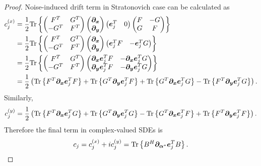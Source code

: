 \begin{proof}
Noise-induced drift term in Stratonovich case can be calculated as
\begin{equation*}
\begin{split}
	c_j^{(x)}
	& = \frac{1}{2} \mathrm{Tr} \left\{ 
		\begin{pmatrix}
			F^T & G^T \\ -G^T & F^T
		\end{pmatrix}
		\begin{pmatrix}
			\bm{\partial}_{\bm{x}} \\
			\bm{\partial}_{\bm{y}}
		\end{pmatrix}
		\begin{pmatrix}
			\bm{e}_j^T & 0
		\end{pmatrix}
		\begin{pmatrix}
			F & -G \\ G & F
		\end{pmatrix}
	 \right\} \\
	& = \frac{1}{2} \mathrm{Tr} \left\{ 
		\begin{pmatrix}
			F^T & G^T \\ -G^T & F^T
		\end{pmatrix}
		\begin{pmatrix}
			\bm{\partial}_{\bm{x}} \\
			\bm{\partial}_{\bm{y}}
		\end{pmatrix}
		\begin{pmatrix}
			\bm{e}_j^T F & - \bm{e}_j^T G
		\end{pmatrix}
	 \right\} \\
	& = \frac{1}{2} \mathrm{Tr} \left\{ 
		\begin{pmatrix}
			F^T & G^T \\ -G^T & F^T
		\end{pmatrix}
		\begin{pmatrix}
			\bm{\partial}_{\bm{x}} \bm{e}_j^T F & - \bm{\partial}_{\bm{x}} \bm{e}_j^T G \\
			\bm{\partial}_{\bm{y}} \bm{e}_j^T F & - \bm{\partial}_{\bm{y}} \bm{e}_j^T G
		\end{pmatrix}
	 \right\} \\
	& = \frac{1}{2} \left(
		\mathrm{Tr} \left\{  F^T \bm{\partial}_{\bm{x}} \bm{e}_j^T F  \right\}
		+ \mathrm{Tr} \left\{  G^T \bm{\partial}_{\bm{y}} \bm{e}_j^T F  \right\}
		+ \mathrm{Tr} \left\{  G^T \bm{\partial}_{\bm{x}} \bm{e}_j^T G  \right\}
		- \mathrm{Tr} \left\{  F^T \bm{\partial}_{\bm{y}} \bm{e}_j^T G  \right\}
	\right).
\end{split}
\end{equation*}
Similarly,
\[
	c_j^{(y)}
	= \frac{1}{2} \left(
		\mathrm{Tr} \left\{  F^T \bm{\partial}_{\bm{x}} \bm{e}_j^T G  \right\}
		+ \mathrm{Tr} \left\{  G^T \bm{\partial}_{\bm{y}} \bm{e}_j^T G  \right\}
		- \mathrm{Tr} \left\{  G^T \bm{\partial}_{\bm{x}} \bm{e}_j^T F  \right\}
		+ \mathrm{Tr} \left\{  F^T \bm{\partial}_{\bm{y}} \bm{e}_j^T F  \right\}
	\right).
\]
Therefore the final term in complex-valued SDEs is
\[
	c_j
	= c_j^{(x)} + i c_j^{(y)}
	= \mathrm{Tr} \left\{  B^H \bm{\partial}_{\bm{\alpha}^*} \bm{e}_j^T B  \right\}.
	\qedhere
\]
\end{proof}

